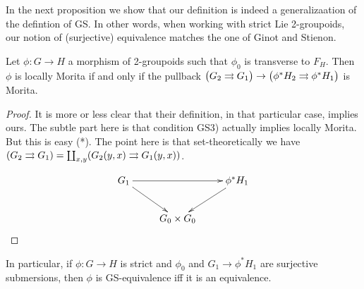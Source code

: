 
In the next proposition we show that our definition is indeed a generalizaation of the defintion of GS. In other words, when working with strict Lie 2-groupoids, our notion of (surjective) equivalence matches the one of Ginot and Stienon.

\begin{prop}
Let $\phi:G\to H$ a morphism of 2-groupoids such that $\phi_0$ is transverse to $F_H$. Then
$\phi$ is locally Morita if and only if the pullback $ \big( G_2\rightrightarrows G_1 \big) \to \big( \phi^*H_2\rightrightarrows \phi^*H_1 \big) $ is Morita.
\end{prop}

\begin{proof}
It is more or less clear that their definition, in that particular case, implies ours. The subtle part here is that condition GS3) actually implies locally Morita. But this is easy (*). The point here is that set-theoretically we have $(G_2\rightrightarrows G_1)=\coprod_{x,y}(G_2(y,x)\rightrightarrows G_1(y,x))$.

$$\xymatrix{  G_1 \ar[rr] \ar[rd]& & \phi^*H_1\ar[dl] \\ & G_0\times G_0 & }$$

\end{proof}


\begin{coro}
In particular, if $\phi:G\to H$ is strict and  $\phi_0$ and $G_1\to\phi^*H_1$ are surjective submersions, then $\phi$ is GS-equivalence iff it is an equivalence.
\end{coro}



